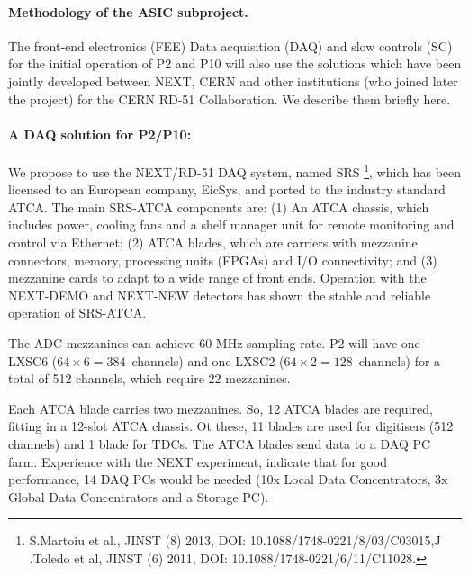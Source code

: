 \paragraph{Methodology of the ASIC subproject.}

The front-end electronics (FEE) Data acquisition (DAQ) and slow controls (SC) 
for the initial operation of P2 and P10 will also use the solutions which have been jointly developed between NEXT, CERN and other institutions (who joined later the project) for the CERN RD-51 Collaboration. We describe them briefly here. 

\paragraph{A DAQ solution for P2/P10:}
%
We propose to use the NEXT/RD-51 DAQ system, named SRS \footnote{S.Martoiu et al., JINST (8) 2013, DOI: 10.1088/1748-0221/8/03/C03015,J .Toledo et al, JINST (6) 2011, DOI: 10.1088/1748-0221/6/11/C11028.}, which has been licensed to an European company, EicSys, and ported to the industry standard ATCA.
%
The main SRS-ATCA components are: (1) An ATCA chassis, which includes power, cooling fans and a shelf manager unit for remote monitoring and control via Ethernet; (2) ATCA blades, which are carriers with mezzanine connectors, memory, processing units (FPGAs) and I/O connectivity; and (3) mezzanine cards to adapt to a wide range of front ends. Operation with the NEXT-DEMO and NEXT-NEW detectors has shown the stable and reliable operation of SRS-ATCA. 

The ADC mezzanines can achieve 60 MHz sampling rate. P2 will have one LXSC6 ($64 \times 6 = 384$~channels) and one LXSC2 ($64 \times 2 = 128$~channels) for a total of 512 channels, which require 22 mezzanines.

Each ATCA blade carries two mezzanines. So, 12 ATCA blades are required, fitting in a 12-slot  ATCA chassis. Ot these, 11 blades are used for digitisers (512 channels) and 1 blade for TDCs. The ATCA blades send data to a DAQ PC farm. Experience with the NEXT experiment, indicate that for good performance, 14 DAQ PCs would be needed (10x Local Data Concentrators, 3x Global Data Concentrators and a Storage PC). 
%
%
%
